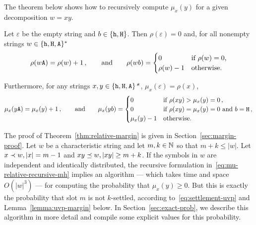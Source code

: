 
The theorem below shows how to recursively compute $\mu_x(y)$ 
for a given decomposition $w = xy$.


\begin{theorem}\label{thm:relative-margin}
  Let $\varepsilon$ be the empty string 
  and $b \in \{\mathtt{h}, \mathtt{H}\}$. 
  Then $\rho(\varepsilon) = 0$ 
  and, for all nonempty strings $w \in \{\mathtt{h}, \mathtt{H}, \mathtt{A}\}^*$ 
  \begin{equation}
    \rho(w\mathtt{A}) = \rho(w) + 1\,, \qquad\text{and}\qquad
    \rho(wb) = \begin{cases} 0 & \text{if $\rho(w) = 0$,}\\
      \rho(w)-1 & \text{otherwise.}
    \end{cases}
    \label{eq:rho-recursive-mh}
  \end{equation}


  Furthermore, for any strings $x, y \in\{\mathtt{h}, \mathtt{H}, \mathtt{A}\}\text{\emph{*}}$,
  $\mu_x(\varepsilon) =\rho(x)$, 
  \begin{equation}
    \mu_x(y\mathtt{A})= \mu_x(y)+1\,,\qquad\text{and}\qquad
    \mu_x(yb)= \begin{cases}
      0 & \text{if $\rho(xy) > \mu_x(y)=0$}\,, \\
      0 & \text{if $\rho(xy) = \mu_x(y) = 0$ and $b = \mathtt{H}$}\,, \\
      \mu_x(y)-1 & \text{otherwise.}
    \end{cases}
    \label{eq:mu-relative-recursive-mh}
  \end{equation}

\end{theorem}
The proof of Theorem~\ref{thm:relative-margin} is given in Section~\ref{sec:margin-proof}. 
Let $w$ be a characteristic string and 
let $m, k \in \mathbb{N}$ so that $m + k \leq |w|$. 
Let $x \prec w, |x| = m-1$ and $xy \preceq w, |xy| \geq m + k$.
If the symbols in $w$ are independent and identically distributed, 
the recursive formulation in~\eqref{eq:mu-relative-recursive-mh} implies an algorithm --- which takes time and space $O(|w|^3)$ --- 
for computing the probability that $\mu_x(y) \geq 0$. 
But this is exactly the probability that slot $m$ is not $k$-settled, 
according to~\eqref{eq:settlement-uvp} 
and Lemma~\ref{lemma:uvp-margin} below. 
In Section~\ref{sec:exact-prob}, 
we describe this algorithm in more detail and 
compile some explicit values for this probability.




